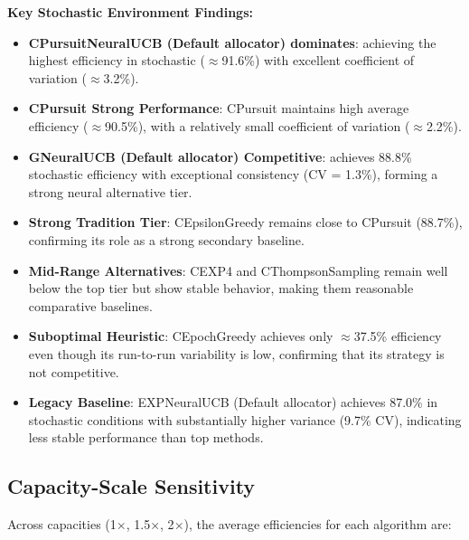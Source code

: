 \documentclass[12pt,a4paper]{article}
\newcommand{\stochastic}[1]{\textcolor{stochasticcolor}{\textbf{#1}}}
\newcommand{\critical}[1]{\textcolor{criticalcolor}{\textbf{#1}}}
\newcommand{\legacy}[1]{\textcolor{legacycolor}{\textbf{#1}}}
\newcommand{\neural}[1]{\textcolor{neuralcolor}{\textbf{#1}}}
\begin{document}
\begin{tcolorbox}[colback=stochasticcolor!10,colframe=stochasticcolor,title=\textbf{Stochastic Environment Deep Analysis (1$\times$–2$\times$ Capacities, T/Tb Combined)}]
\textbf{Key Stochastic Environment Findings:}
\begin{itemize}
\item \neural{CPursuitNeuralUCB (Default allocator) dominates}: achieving the highest efficiency in stochastic ($\approx$91.6\%) with excellent coefficient of variation ($\approx$3.2\%).
\item \stochastic{CPursuit Strong Performance}: CPursuit maintains high average efficiency ($\approx$90.5\%), with a relatively small coefficient of variation ($\approx$2.2\%).
\item \neural{GNeuralUCB (Default allocator) Competitive}: achieves 88.8\% stochastic efficiency with exceptional consistency (CV = 1.3\%), forming a strong neural alternative tier.
\item \stochastic{Strong Tradition Tier}: CEpsilonGreedy remains close to CPursuit (88.7\%), confirming its role as a strong secondary baseline.
\item \stochastic{Mid-Range Alternatives}: CEXP4 and CThompsonSampling remain well below the top tier but show stable behavior, making them reasonable comparative baselines.
\item \critical{Suboptimal Heuristic}: CEpochGreedy achieves only $\approx$37.5\% efficiency even though its run-to-run variability is low, confirming that its strategy is not competitive.
\item \legacy{Legacy Baseline}: EXPNeuralUCB (Default allocator) achieves 87.0\% in stochastic conditions with substantially higher variance (9.7\% CV), indicating less stable performance than top methods.
\end{itemize}

\end{tcolorbox}

\newpage
\subsection{Capacity-Scale Sensitivity}

Across capacities (1$\times$, 1.5$\times$, 2$\times$), the average efficiencies for each algorithm are:
\end{document}
